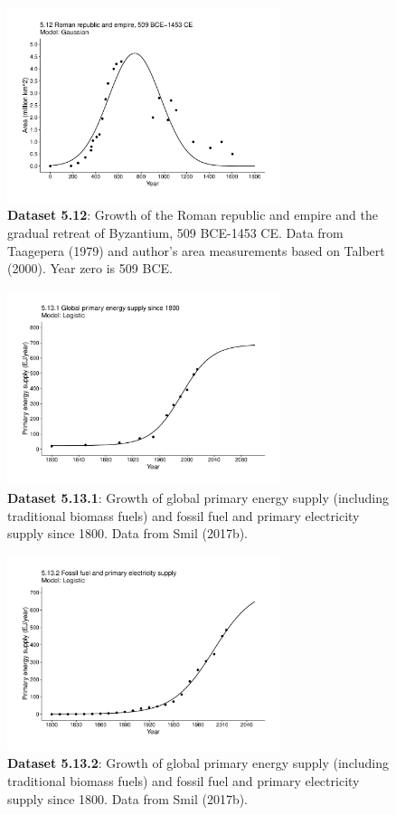 \documentclass[aps,rmp,preprint,superscriptaddress,10pt,onecolumn]{article}
\begin{document}
\begin{figure}[h]
\includegraphics[width=8cm]{output/figs-ggplot/5.12.pdf}
\caption{\textbf{Dataset 5.12}: Growth of the Roman republic and empire and the gradual retreat of Byzantium, 509 BCE-1453 CE. Data from Taagepera (1979) and author's area measurements based on Talbert (2000). Year zero is 509 BCE. }
\end{figure}
	
\begin{figure}[h]
\includegraphics[width=8cm]{output/figs-ggplot/5.13.1.pdf}
\caption{\textbf{Dataset 5.13.1}: Growth of global primary energy supply (including traditional biomass fuels) and fossil fuel and primary electricity supply since 1800. Data from Smil (2017b). }
\end{figure}
	
\begin{figure}[h]
\includegraphics[width=8cm]{output/figs-ggplot/5.13.2.pdf}
\caption{\textbf{Dataset 5.13.2}: Growth of global primary energy supply (including traditional biomass fuels) and fossil fuel and primary electricity supply since 1800. Data from Smil (2017b). }
\end{figure}
	
\end{document}
